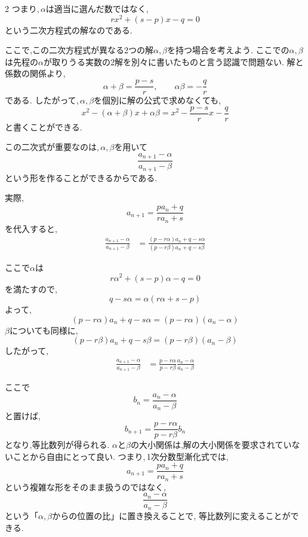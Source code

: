 \documentclass[dvipdfmx,a4paper,11pt,fleqn,openany]{jsbook}
\begin{document}
\begin{multicols*}{2}
      つまり,\,$\alpha$は適当に選んだ数ではなく,
      \[
        rx^2+(s-p)x-q=0
      \]
      という二次方程式の解なのである.
      
      ここで,この二次方程式が異なる2つの解$\alpha,\beta$を持つ場合を考えよう.
      ここでの$\alpha,\beta$は先程の$\alpha$が取りうる実数の2解を別々に書いたものと言う認識で問題ない.
      解と係数の関係より,
      \[
        \alpha+\beta=\frac{p-s}{r},
        \qquad
        \alpha\beta=-\frac qr
      \]
      である.
      したがって,\,$\alpha,\beta$を個別に解の公式で求めなくても,
      \[
        x^2-(\alpha+\beta)x+\alpha\beta
        =
        x^2-\frac{p-s}{r}x-\frac qr
      \]
      と書くことができる.

      この二次式が重要なのは,\,$\alpha,\beta$を用いて
      \[
        \frac{a_{n+1}-\alpha}{a_{n+1}-\beta}
      \]
      という形を作ることができるからである.

      実際,
      \[
        a_{n+1}=\frac{pa_n+q}{ra_n+s}
      \]
      を代入すると,
      \begin{align*}
        \frac{a_{n+1}-\alpha}{a_{n+1}-\beta}
        &=
        \frac{(p-r\alpha)a_n+q-s\alpha}{(p-r\beta)a_n+q-s\beta}
      \end{align*}
      
      ここで$\alpha$は
      \[
        r\alpha^2+(s-p)\alpha-q=0
      \]
      を満たすので,
      \[
        q-s\alpha
        =\alpha(r\alpha+s-p)
      \]
      よって,
      \[
        (p-r\alpha)a_n+q-s\alpha
        =(p-r\alpha)(a_n-\alpha)
      \]
      $\beta$についても同様に,
      \[
        (p-r\beta)a_n+q-s\beta
        =(p-r\beta)(a_n-\beta)
      \]
      したがって,
      \begin{align*}
        \frac{a_{n+1}-\alpha}{a_{n+1}-\beta}
        &=
        \frac{p-r\alpha}{p-r\beta}
        \frac{a_n-\alpha}{a_n-\beta}
      \end{align*}
      
      ここで
      \[
        b_n=\frac{a_n-\alpha}{a_n-\beta}
      \]
      と置けば,
      \[
        b_{n+1}
        =
        \frac{p-r\alpha}{p-r\beta}b_n
      \]
      となり,等比数列が得られる.
      $\alpha$と$\beta$の大小関係は,解の大小関係を要求されていないことから自由にとって良い.
      つまり,\,1次分数型漸化式では,
      \[
        a_{n+1}=\frac{pa_n+q}{ra_n+s}
      \]
      という複雑な形をそのまま扱うのではなく,
      \[
        \frac{a_n-\alpha}{a_n-\beta}
      \]
      という「$\alpha,\beta$からの位置の比」に置き換えることで,
      等比数列に変えることができる.


\end{multicols*}
\end{document}
